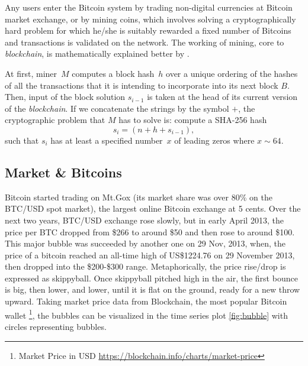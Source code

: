\documentclass[12pt,a4paper]{article}
\numberwithin{equation}{section}
\numberwithin{figure}{section}
\numberwithin{table}{section}
\begin{document}
Any users enter the Bitcoin system by trading non-digital currencies at Bitcoin market exchange, or by mining coins, which involves solving a cryptographically hard problem for which he/she is suitably rewarded a fixed number of Bitcoins  and transactions is validated on the network. The working of mining, core to {\it blockchain}, is mathematically explained better by \cite{Johannes2015}. 

At first, miner~$M$ computes a block hash~$h$ over a unique ordering
of the hashes of all the transactions that it is intending to incorporate into its next block $B$.  Then, input of the block solution $s_{i-1}$ is taken at the head of its current version of the {\it blockchain}. If we concatenate the strings by the symbol $+$, the cryptographic problem that $M$ has to solve is: compute a SHA-256 hash
%
\begin{equation} \label{eq:1.1}
s_i = (n + h + s_{i-1}),
\end{equation}
%
such that $s_i$ has at least a specified number~$x$ of leading zeros where $x \sim 64$. 

\subsection{Market \& Bitcoins}
\label{subsec:Market and Bitcoins}

Bitcoin started trading	 on Mt.Gox (its market share was over 80\% on the BTC/USD spot market), the largest online Bitcoin exchange at 5 cents. Over the next	 two	 years,	BTC/USD exchange rose slowly, but in early April 2013, the price per BTC dropped from \$266 to around \$50 and then rose to around \$100. This major bubble was succeeded by another one on 29 Nov, 2013, when, the price of a bitcoin reached an all-time high of US\$1224.76 on 29 November 2013, then dropped into the \$200-\$300 range. Metaphorically, the price rise/drop is expressed as skippyball. Once skippyball pitched high in the air, the first bounce is big, then lower, and lower, until it is flat on the ground, ready for a new throw upward. Taking market price data from Blockchain, the most popular Bitcoin wallet \footnote{Market Price in USD \url{https://blockchain.info/charts/market-price}}, the bubbles can be visualized in the time series plot \ref{fig:bubble} with circles representing bubbles.
\end{document}

